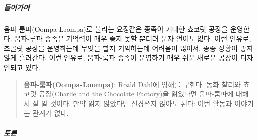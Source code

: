 \documentclass[]{article}
\begin{document}
\subparagraph{들어가며}\label{section-263}

움파-룸파(Oompa-Loompa)로 불리는 요정같은 종족이 거대한 쵸코릿 공장을
운영한다. 움파-루파 종족은 기억력이 매우 좋지 못할 뿐더러 문자 언어도
없다. 이런 연유로, 쵸콜릿 공장을 운영하는데 무엇을 할지 기억하는데
어려움이 많아서, 종종 상황이 좋지 않게 흘러간다. 이런 연유로, 움파-룸파
종족이 운영하기 매우 쉬운 새로운 공장이 디자인되고 있다.

\begin{quote}
\textbf{움파-룸파(Oompa-Loompa)}: Roald Dahl에 양해를 구한다. 동화
챨리와 쵸코릿 공장(Charlie and the Chocolate Factory)을 읽었다면
움파-룸파에 대해서 잘 알 것이다. 만약 읽지 않았다면 신경쓰지 않아도
된다: 이번 활동과 이야기는 관계가 없다.
\end{quote}

\subparagraph{토론}\label{section-264}
\end{document}
